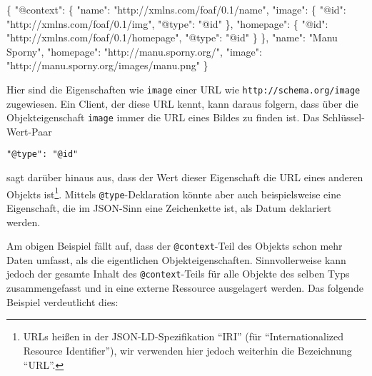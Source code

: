 \documentclass[,a4paper]{article}
\newenvironment{Shaded}{}{}
\newcommand{\DataTypeTok}[1]{\textcolor[rgb]{0.56,0.13,0.00}{{#1}}}
\newcommand{\StringTok}[1]{\textcolor[rgb]{0.25,0.44,0.63}{{#1}}}
\newcommand{\FunctionTok}[1]{\textcolor[rgb]{0.02,0.16,0.49}{{#1}}}
\begin{document}
\begin{Shaded}
\begin{Highlighting}[]
\FunctionTok{\{}
  \DataTypeTok{"@context"}\FunctionTok{:}
  \FunctionTok{\{}
    \DataTypeTok{"name"}\FunctionTok{:} \StringTok{"http://xmlns.com/foaf/0.1/name"}\FunctionTok{,}
    \DataTypeTok{"image"}\FunctionTok{:} \FunctionTok{\{}
      \DataTypeTok{"@id"}\FunctionTok{:} \StringTok{"http://xmlns.com/foaf/0.1/img"}\FunctionTok{,}
      \DataTypeTok{"@type"}\FunctionTok{:} \StringTok{"@id"}
    \FunctionTok{\},}
    \DataTypeTok{"homepage"}\FunctionTok{:} \FunctionTok{\{}
      \DataTypeTok{"@id"}\FunctionTok{:} \StringTok{"http://xmlns.com/foaf/0.1/homepage"}\FunctionTok{,}
      \DataTypeTok{"@type"}\FunctionTok{:} \StringTok{"@id"}
    \FunctionTok{\}}
  \FunctionTok{\},}
  \DataTypeTok{"name"}\FunctionTok{:} \StringTok{"Manu Sporny"}\FunctionTok{,}
  \DataTypeTok{"homepage"}\FunctionTok{:} \StringTok{"http://manu.sporny.org/"}\FunctionTok{,}
  \DataTypeTok{"image"}\FunctionTok{:} \StringTok{"http://manu.sporny.org/images/manu.png"}
\FunctionTok{\}}
\end{Highlighting}
\end{Shaded}

Hier sind die Eigenschaften wie \texttt{image} einer URL wie
\texttt{http://schema.org/image} zugewiesen. Ein Client, der diese URL
kennt, kann daraus folgern, dass über die Objekteigenschaft
\texttt{image} immer die URL eines Bildes zu finden ist. Das
Schlüssel-Wert-Paar

\begin{verbatim}
"@type": "@id"
\end{verbatim}

sagt darüber hinaus aus, dass der Wert dieser Eigenschaft die URL eines
anderen Objekts ist\footnote{URLs heißen in der JSON-LD-Spezifikation
  ``IRI'' (für ``Internationalized Resource Identifier''), wir verwenden
  hier jedoch weiterhin die Bezeichnung ``URL''.}. Mittels
\texttt{@type}-Deklaration könnte aber auch beispielsweise eine
Eigenschaft, die im JSON-Sinn eine Zeichenkette ist, als Datum
deklariert werden.

Am obigen Beispiel fällt auf, dass der \texttt{@context}-Teil des
Objekts schon mehr Daten umfasst, als die eigentlichen
Objekteigenschaften. Sinnvollerweise kann jedoch der gesamte Inhalt des
\texttt{@context}-Teils für alle Objekte des selben Typs zusammengefasst
und in eine externe Ressource ausgelagert werden. Das folgende Beispiel
verdeutlicht dies:
\end{document}
